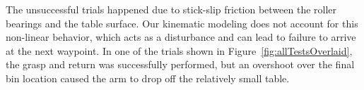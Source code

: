 The unsuccessful trials happened due to stick-slip friction between the roller bearings and the table surface.
Our kinematic modeling does not account for this non-linear behavior, which acts as a disturbance and can lead to failure to arrive at the next waypoint.
In one of the trials shown in Figure~\ref{fig:allTestsOverlaid}, the grasp and return was successfully performed, but an overshoot over the final bin location caused the arm to drop off the relatively small table.

